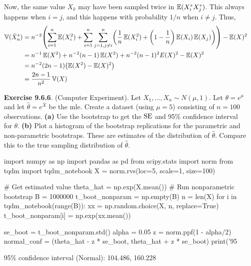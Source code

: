 Now, the same value \(X_{k}\) may have been sampled twice in
\(\operatorname{\mathbb{E}}(X_{i}^{*} X_{j}^{*})\). This always happens when \(i = j\), and
this happens with probability \(1 / n\) when \(i \neq j\). Thus,
\begin{align*}
\VAR(\bar{X}_{n}^{*}) 
&= n^{-2} \left(\sum_{i=1}^{n} \EXP(X_{i}^{2}) + \sum_{i=1}^{n} \sum_{j=1, j \neq i}^{n} \left( \frac{1}{n} \EXP(X_{i}^{2}) + \left(1 - \frac{1}{n}\right)\EXP(X_{i})\EXP(X_{j})\right) \right) - \EXP(X)^{2} \\
&= n^{-1} \EXP(X^{2}) + n^{-2} (n-1) \EXP(X^{2}) + n^{-2}(n-1)^{2} E(X)^{2} - \EXP(X)^{2} \\
&= n^{-2} (2n - 1) \left( \EXP(X^{2}) - \EXP(X)^{2} \right) \\
&= \frac{2n - 1}{n^{2}} \VAR(X)
\end{align*}

\textbf{Exercise 9.6.6}. (Computer Experiment). Let
\(X_{1}, \dots, X_{n} \sim N(\mu, 1)\). Let \(\theta = e^\mu\)and let
\(\hat{\theta} = e^{\bar{X}}\) be the mle. Create a dataset (using
\(\mu = 5\)) consisting of \(n = 100\) observations.
\textbf{(a)} Use the bootstrap to get the \(\operatorname{\mathrm{SE}} \) and 95\%
confidence interval for \(\theta\).
\textbf{(b)} Plot a histogram of the bootstrap replications for the
parametric and non-parametric bootstraps. These are estimates of the
distribution of \(\hat{\theta}\). Compare this to the true sampling
distribution of \(\hat{\theta}\).

\begin{python}
import numpy as np
import pandas as pd
from scipy.stats import norm
from tqdm import tqdm_notebook
X = norm.rvs(loc=5, scale=1, size=100)
\end{python}

\begin{python}
# Get estimated value
theta_hat = np.exp(X.mean())
# Run nonparametric bootstrap
B = 1000000
t_boot_nonparam = np.empty(B)
n = len(X)
for i in tqdm_notebook(range(B)):
    xx = np.random.choice(X, n, replace=True)
    t_boot_nonparam[i] = np.exp(xx.mean())
    
se_boot = t_boot_nonparam.std()
alpha = 0.05
z = norm.ppf(1 - alpha/2)
normal_conf = (theta_hat - z * se_boot, theta_hat + z * se_boot)
print('95%
\end{python}
\begin{console}
95\% confidence interval (Normal):        104.486, 160.228
\end{console}

